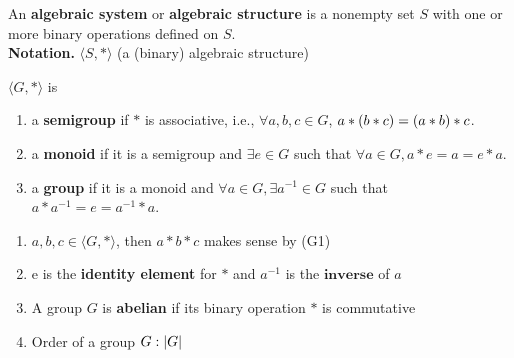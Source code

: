 \begin{definition}
    An \textbf{algebraic system} or \textbf{algebraic structure} is a nonempty set $S$ with one or more binary operations defined on $S$. \\
    \textbf{Notation.} $\langle S, \ast \rangle$ (a (binary) algebraic structure)
\end{definition} 

\begin{definition}[Groups]
    $\langle G, \ast \rangle$ is 
    \begin{enumerate}
        \item a \textbf{semigroup} if $\ast$ is associative, i.e., $\forall a, b, c \in G$, $a \ast \qty(b \ast c) = \qty(a \ast b) \ast c$.
        \item a \textbf{monoid} if it is a semigroup and $\exists e \in G$ such that $\forall a \in G, a \ast e  = a = e \ast a$.
        \item a \textbf{group} if it is a monoid and $\forall a \in G,  \exists a^{-1} \in G$ such that $a \ast a^{-1}  = e = a^{-1} \ast a$.
    \end{enumerate}
\end{definition}

\begin{remark} \phantom{blank}
    \begin{enumerate}
        \item $a, b, c \in \langle G, \ast \rangle$, then $a \ast b \ast c$ makes sense by (G1)
        \item e is the \textbf{identity element} for $\ast$ and $a^{-1}$ is the $\textbf{inverse}$ of $a$
        \item A group $G$ is \textbf{abelian} if its binary operation $\ast$ is commutative
        \item Order of a group $G: \qty|G|$
    \end{enumerate}
\end{remark} 

